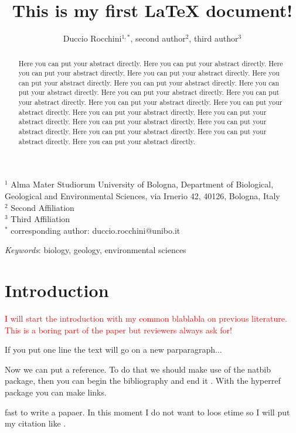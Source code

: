 \documentclass[a4paper,12pt]{article}
\title{This is my first LaTeX document!}
\author{Duccio Rocchini$^{1,*}$, second author$^2$, third author$^3$}
\begin{document}
\maketitle

\noindent
$^1$ Alma Mater Studiorum University of Bologna, Department of Biological, Geological and Environmental Sciences, via Irnerio 42, 40126, Bologna, Italy\\
$^2$ Second Affiliation \\
$^3$ Third Affiliation \\
$^*$ corresponding author: duccio.rocchini@unibo.it

\begin{abstract}
Here you can put your abstract directly. Here you can put your abstract directly. Here you can put your abstract directly. Here you can put your abstract directly. Here you can put your abstract directly. Here you can put your abstract directly. Here you can put your abstract directly. Here you can put your abstract directly. Here you can put your abstract directly. Here you can put your abstract directly. Here you can put your abstract directly. Here you can put your abstract directly. Here you can put your abstract directly. Here you can put your abstract directly. Here you can put your abstract directly. Here you can put your abstract directly. Here you can put your abstract directly. Here you can put your abstract directly. 
\end{abstract}

\bigskip
\textit{Keywords}: biology, geology, environmental sciences

\newpage
\section{Introduction}

\textcolor{red}{I will start the introduction with my common blablabla on previous literature. This is a boring part of the paper but reviewers always ask for! }

If you put one line the text will go on a new parparagraph...

Now we can put a reference. To do that we should make use of the natbib package, then you can begin the bibliography and end it \citep{borcard}. With the hyperref package you can make links.

fast to write a papaer. In this moment I do not want to loos etime so I will put my citation like \citep{phelps}. 
\end{document}
